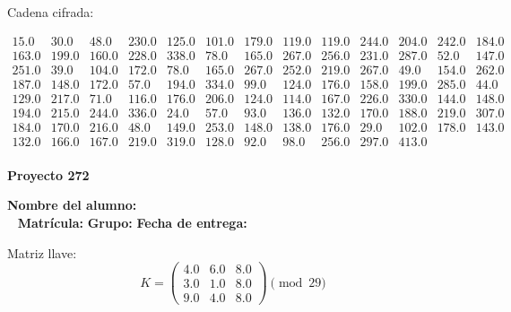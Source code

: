 \documentclass[12pt]{article}
\begin{document}
Cadena cifrada:
\begin{center}
$\begin{array}{lllllllllllll}
15.0 & 30.0 & 48.0 & 230.0 & 125.0 & 101.0 & 179.0 & 119.0 & 119.0 & 244.0 & 204.0 & 242.0 & 184.0\\
163.0 & 199.0 & 160.0 & 228.0 & 338.0 & 78.0 & 165.0 & 267.0 & 256.0 & 231.0 & 287.0 & 52.0 & 147.0\\
251.0 & 39.0 & 104.0 & 172.0 & 78.0 & 165.0 & 267.0 & 252.0 & 219.0 & 267.0 & 49.0 & 154.0 & 262.0\\
187.0 & 148.0 & 172.0 & 57.0 & 194.0 & 334.0 & 99.0 & 124.0 & 176.0 & 158.0 & 199.0 & 285.0 & 44.0\\
129.0 & 217.0 & 71.0 & 116.0 & 176.0 & 206.0 & 124.0 & 114.0 & 167.0 & 226.0 & 330.0 & 144.0 & 148.0\\
194.0 & 215.0 & 244.0 & 336.0 & 24.0 & 57.0 & 93.0 & 136.0 & 132.0 & 170.0 & 188.0 & 219.0 & 307.0\\
184.0 & 170.0 & 216.0 & 48.0 & 149.0 & 253.0 & 148.0 & 138.0 & 176.0 & 29.0 & 102.0 & 178.0 & 143.0\\
132.0 & 166.0 & 167.0 & 219.0 & 319.0 & 128.0 & 92.0 & 98.0 & 256.0 & 297.0 & 413.0\\
\end{array}$
\end{center}

\newpage


\textbf{Proyecto 272}

\textbf{Nombre del alumno:} \underline{\hspace{13cm}}\\\
\vspace{1cm}
\textbf{Matrícula:} \underline{\hspace{4cm}} \hspace{1cm}
\textbf{Grupo:} \underline{\hspace{2cm}}
\textbf{Fecha de entrega:} \underline{\hspace{2cm}}

\medskip

Matriz llave:
\[
K = \begin{pmatrix}
4.0 & 6.0 & 8.0\\
3.0 & 1.0 & 8.0\\
9.0 & 4.0 & 8.0
\end{pmatrix} \pmod{29}
\]
\end{document}
